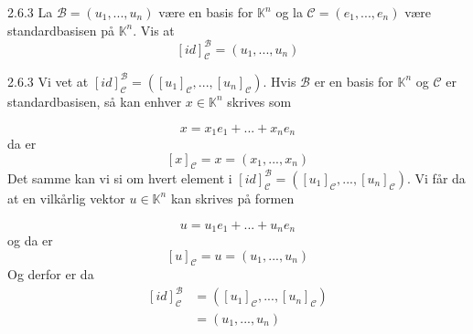 \documentclass[a4paper,norsk]{article}
\begin{document}
\begin{oppgavebox}{2.6.3}{}
La $ \mathcal{B} = \left( u_1, ..., u_n \right)  $ være en basis for $ \mathbb{K}^n $ og la $ \mathcal{C} = \left( e_1, ..., e_n \right)  $  være standardbasisen på $ \mathbb{K}^n $. Vis at 
\[
    \left[ id \right] _{\mathcal{C}}^{\mathcal{B}} = \left( u_1, ..., u_n \right) 
\]

\begin{proofbox}{2.6.3}{}
Vi vet at $ \left[ id \right] _{\mathcal{C}}^{\mathcal{B}} = \left( \left[ u_1 \right] _{\mathcal{C}}, ..., \left[ u_n \right] _{\mathcal{C}} \right)  $. Hvis $ \mathcal{B} $ er en basis for $ \mathbb{K}^n $  og $ \mathcal{C} $ er standardbasisen, så kan enhver $ x \in  \mathbb{K}^n $ skrives som

\[
    x = x_1 e_1 + ... + x_n e_n
\]
da er
\[
    \left[ x \right] _{\mathcal{C}} = x = \left( x_1, ..., x_n \right) 
\]
Det samme kan vi si om hvert element i $ \left[ id \right] _{\mathcal{C}} ^{\mathcal{B}} = \left( \left[ u_1 \right] _{\mathcal{C}}, ..., \left[ u_n \right] _{\mathcal{C}} \right)  $. Vi får da at en vilkårlig vektor $ u \in \mathbb{K}^n $ kan skrives på formen

\[
    u = u_1 e_1 + ... + u_n e_n
\]
og da er
\[
    \left[ u \right] _{\mathcal{C}} = u = \left( u_1, ..., u_n \right) 
\]
Og derfor er da 
\begin{align*}
  \left[ id \right] _{\mathcal{C}} ^{\mathcal{B}} &= \left( \left[ u_1 \right] _{\mathcal{C}}, ..., \left[ u_n \right] _{\mathcal{C}} \right)\\
  &= \left( u_1, ..., u_n \right) 
\end{align*}
\end{proofbox}
\end{oppgavebox}
\end{document}
